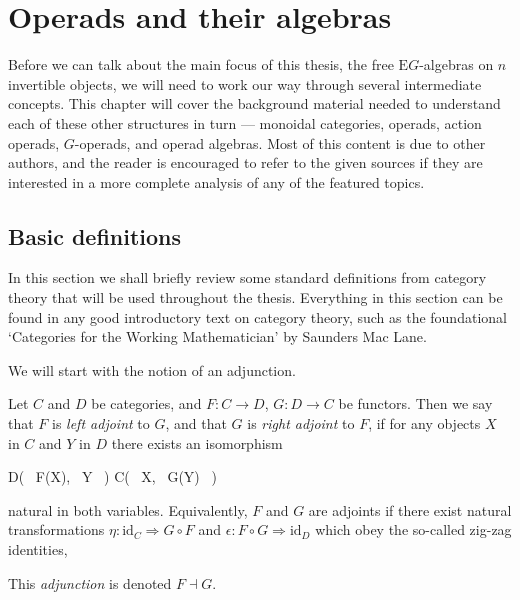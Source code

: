 \chapter{Operads and their algebras} \label{actionoperad} 

Before we can talk about the main focus of this thesis, the free $\mathrm{E}G$-algebras on $n$ invertible objects, we will need to work our way through several intermediate concepts. This chapter will cover the background material needed to understand each of these other structures in turn --- monoidal categories, operads, action operads, $G$-operads, and operad algebras. Most of this content is due to other authors, and the reader is encouraged to refer to the given sources if they are interested in a more complete analysis of any of the featured topics. 

\section{Basic definitions}

In this section we shall briefly review some standard definitions from category theory that will be used throughout the thesis. Everything in this section can be found in any good introductory text on category theory, such as the foundational `Categories for the Working Mathematician' \cite{cwm} by Saunders Mac Lane.

We will start with the notion of an adjunction.

\begin{defn} Let $C$ and $D$ be categories, and $F: C \to D$, $G: D \to C$ be functors. Then we say that $F$ is \emph{left adjoint} to $G$, and that $G$ is \emph{right adjoint} to $F$, if for any objects $X$ in $C$ and $Y$ in $D$ there exists an isomorphism
\begin{eq*} D\big( \, F(X), \,  Y \, \big) \quad \cong \quad C\big( \, X, \, G(Y) \, \big) \end{eq*}
natural in both variables. Equivalently, $F$ and $G$ are adjoints if there exist natural transformations $\eta: \mathrm{id}_{C} \Rightarrow G \circ F$ and $\epsilon : F \circ G \Rightarrow \mathrm{id}_{D}$ which obey the so-called zig-zag identities,
\begin{eq*}  \end{eq*}
This \emph{adjunction} is denoted $F \dashv G$.
\end{defn}

